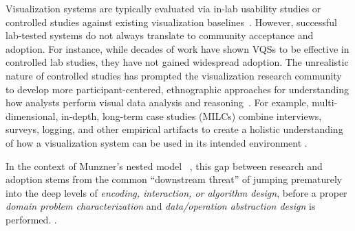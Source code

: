 {  \npar Visualization systems are typically evaluated via in-lab usability studies or controlled studies against existing visualization baselines~\cite{Plaisant2004,North2006,Yi2008}. However, successful lab-tested systems do not always translate to community acceptance and adoption. For instance, while decades of work have shown VQSs to be effective in controlled lab studies, they have not gained widespread adoption.  The unrealistic nature of controlled studies has prompted the visualization research community to develop more participant-centered, ethnographic approaches for understanding how analysts perform visual data analysis and reasoning~\cite{Plaisant2004,lam2012empirical,shneiderman2006strategies,munzner2009nested,Sedlmair2012}. For example, multi-dimensional, in-depth, long-term case studies (MILCs) combine interviews, surveys, logging, and other empirical artifacts to create a holistic understanding of how a visualization system can be used in its intended environment \cite{shneiderman2006strategies}. 
  \par In the context of Munzner's nested model ~\cite{munzner2009nested}, this gap between research and adoption stems from the common ``downstream threat'' of jumping prematurely into the deep levels of \textit{encoding, interaction, or algorithm design}, before a proper \textit{domain problem characterization} and \textit{data/operation abstraction design} is performed. .
}
